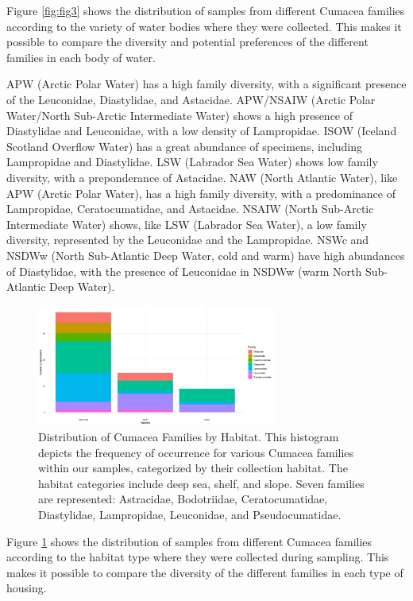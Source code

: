 Figure \ref{fig:fig3} shows the distribution of samples from different Cumacea families according to the variety of water bodies where they were collected. This makes it possible to compare the diversity and potential preferences of the different families in each body of water. 

APW (Arctic Polar Water) has a high family diversity, with a significant presence of the Leuconidae, Diastylidae, and Astacidae. APW/NSAIW (Arctic Polar Water/North Sub-Arctic Intermediate Water) shows a high presence of Diastylidae and Leuconidae, with a low density of Lampropidae. ISOW (Iceland Scotland Overflow Water) has a great abundance of specimens, including Lampropidae and  Diastylidae. LSW (Labrador Sea Water) shows low family diversity, with a preponderance of Astacidae. NAW (North Atlantic Water), like APW (Arctic Polar Water), has a high family diversity, with a predominance of Lampropidae, Ceratocumatidae, and Astacidae. NSAIW (North Sub-Arctic Intermediate Water) shows, like LSW (Labrador Sea Water), a low family diversity, represented by the Leuconidae and the Lampropidae. NSWc and NSDWw (North Sub-Atlantic Deep Water, cold and warm) have high abundances of Diastylidae, with the presence of Leuconidae in NSDWw (warm North Sub-Atlantic Deep Water).

\begin{figure}[]
    \centering
    \includegraphics[width=0.7\textwidth]{figure4.png}
    \caption{Distribution of Cumacea Families by Habitat. This histogram depicts the frequency of occurrence for various Cumacea families within our samples, categorized by their collection habitat. The habitat categories include deep sea, shelf, and slope. Seven families are represented: Astracidae, Bodotriidae, Ceratocumatidae, Diastylidae, Lampropidae, Leuconidae, and Pseudocumatidae. \label{fig:fig4}}
\end{figure}

Figure \ref{fig:fig4} shows the distribution of samples from different Cumacea families according to the habitat type where they were collected during sampling. This makes it possible to compare the diversity of the different families in each type of housing.

